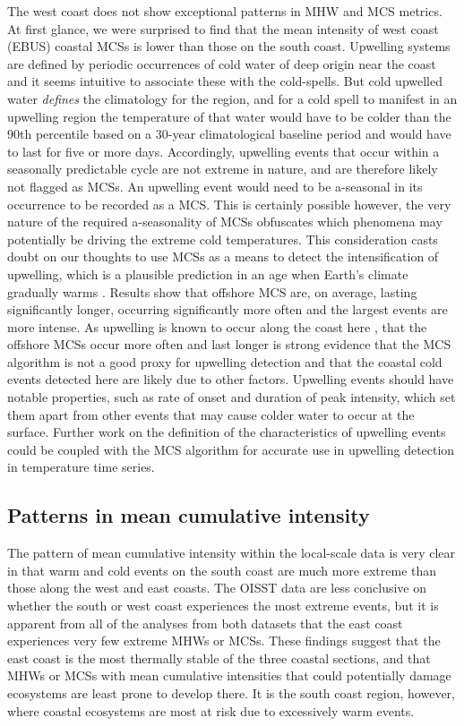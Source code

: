\documentclass[a4paper,10pt,review]{elsarticle}
\begin{document}
The west coast does not show exceptional patterns in MHW and MCS metrics. At first glance, we were surprised to find that the mean intensity of west coast (EBUS) coastal MCSs is lower than those on the south coast. Upwelling systems are defined by periodic occurrences of cold water of deep origin near the coast \citep{Lutjeharms2000, Hutchings2009} and it seems intuitive to associate these with the cold-spells. But cold upwelled water \emph{defines} the climatology for the region, and for a cold spell to manifest in an upwelling region the temperature of that water would have to be colder than the 90th percentile based on a 30-year climatological baseline period and would have to last for five or more days. Accordingly, upwelling events that occur within a seasonally predictable cycle are not extreme in nature, and are therefore likely not flagged as MCSs. An upwelling event would need to be a-seasonal in its occurrence to be recorded as a MCS. This is certainly possible however, the very nature of the required a-seasonality of MCSs obfuscates which phenomena may potentially be driving the extreme cold temperatures. This consideration casts doubt on our thoughts to use MCSs as a means to detect the intensification of upwelling, which is a plausible prediction in an age when Earth's climate gradually warms \citep{Garcia-Reyes2015}. Results show that offshore MCS are, on average, lasting significantly longer, occurring significantly more often and the largest events are more intense. As upwelling is known to occur along the coast here \citep{Hutchings2009}, that the offshore MCSs occur more often and last longer is strong evidence that the MCS algorithm is not a good proxy for upwelling detection and that the coastal cold events detected here are likely due to other factors. Upwelling events should have notable properties, such as rate of onset and duration of peak intensity, which set them apart from other events that may cause colder water to occur at the surface. Further work on the definition of the characteristics of upwelling events could be coupled with the MCS algorithm for accurate use in upwelling detection in temperature time series.

\subsection{Patterns in mean cumulative intensity}
The pattern of mean cumulative intensity within the local-scale data is very clear in that warm and cold events on the south coast are much more extreme than those along the west and east coasts. The OISST data are less conclusive on whether the south or west coast experiences the most extreme events, but it is apparent from all of the analyses from both datasets that the east coast experiences very few extreme MHWs or MCSs. These findings suggest that the east coast is the most thermally stable of the three coastal sections, and that MHWs or MCSs with mean cumulative intensities that could potentially damage ecosystems are least prone to develop there. It is the south coast region, however, where coastal ecosystems are most at risk due to excessively warm events.
\end{document}
